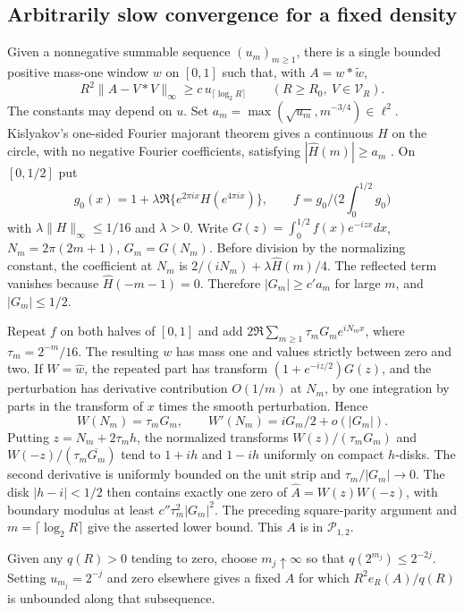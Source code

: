 \documentclass[11pt]{article}
\newcommand{\cV}{\mathcal V}
\newcommand{\cP}{\mathcal P}
\begin{document}
\subsection{Arbitrarily slow convergence for a fixed density}
Given a nonnegative summable sequence \((u_m)_{m\ge1}\), there is a single bounded positive mass-one window \(w\) on \([0,1]\) such that, with \(A=w*\widetilde w\),
\[
      R^2\|A-V*V\|_\infty\ge c\,u_{\lceil\log_2 R\rceil}
      \qquad (R\ge R_0,\ V\in\cV_R).
\]
The constants may depend on \(u\). Set \(a_m=\max(\sqrt{u_m},m^{-3/4})\in\ell^2\). Kislyakov's one-sided Fourier majorant theorem gives a continuous \(H\) on the circle, with no negative Fourier coefficients, satisfying \(|\widehat H(m)|\ge a_m\) \cite[p.~148]{kis}. On \([0,1/2]\) put
\[
 g_0(x)=1+\lambda\Re\{e^{2\pi i x}H(e^{4\pi i x})\},\qquad
 f=g_0\Big/\Big(2\int_0^{1/2}g_0\Big)
\]
with \(\lambda\|H\|_\infty\le1/16\) and \(\lambda>0\). Write \(G(z)=\int_0^{1/2}f(x)e^{-izx}dx\), \(N_m=2\pi(2m+1)\), \(G_m=G(N_m)\). Before division by the normalizing constant, the coefficient at \(N_m\) is \(2/(iN_m)+\lambda\widehat H(m)/4\). The reflected term vanishes because \(\widehat H(-m-1)=0\). Therefore \(|G_m|\ge c'a_m\) for large \(m\), and \(|G_m|\le1/2\).

Repeat \(f\) on both halves of \([0,1]\) and add \(2\Re\sum_{m\ge1}\tau_m G_m e^{iN_mx}\), where \(\tau_m=2^{-m}/16\). The resulting \(w\) has mass one and values strictly between zero and two. If \(W=\widehat w\), the repeated part has transform \((1+e^{-iz/2})G(z)\), and the perturbation has derivative contribution \(O(1/m)\) at \(N_m\), by one integration by parts in the transform of \(x\) times the smooth perturbation. Hence
\[
 W(N_m)=\tau_mG_m,\qquad W'(N_m)=iG_m/2+o(|G_m|).
\]
Putting \(z=N_m+2\tau_m h\), the normalized transforms \(W(z)/(\tau_mG_m)\) and \(W(-z)/(\tau_m\overline{G_m})\) tend to \(1+ih\) and \(1-ih\) uniformly on compact \(h\)-disks. The second derivative is uniformly bounded on the unit strip and \(\tau_m/|G_m|\to0\). The disk \(|h-i|<1/2\) then contains exactly one zero of \(\widehat A=W(z)W(-z)\), with boundary modulus at least \(c''\tau_m^2|G_m|^2\). The preceding square-parity argument and \(m=\lceil\log_2R\rceil\) give the asserted lower bound. This \(A\) is in \(\cP_{1,2}\).

Given any \(q(R)>0\) tending to zero, choose \(m_j\uparrow\infty\) so that \(q(2^{m_j})\le2^{-2j}\). Setting \(u_{m_j}=2^{-j}\) and zero elsewhere gives a fixed \(A\) for which \(R^2e_R(A)/q(R)\) is unbounded along that subsequence.
\end{document}
